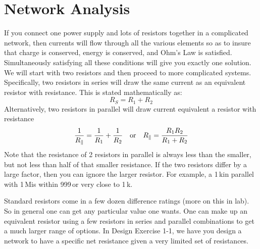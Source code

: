 \documentclass{article}
\begin{document}
\section{Network Analysis}
If you connect one power supply and lots of resistors together in a complicated network, then currents will flow through all the various elements so as to insure that charge is conserved, energy is conserved, and Ohm's Law is satisfied. Simultaneously satisfying all these conditions will give you exactly one solution. We will start with two resistors and then proceed to more complicated systems. Specifically, two resistors in series will draw the same current as an equivalent resistor with resistance. This is stated mathematically as:
\begin{equation}
R_S = R_1 + R_2
\end{equation}
Alternatively, two resistors in parallel will draw current equivalent a resistor with resistance
\begin{equation}
\frac{1}{R_\parallel} = \frac{1}{R_1} + \frac{1}{R_2} \quad \hbox{or} \quad R_\parallel = \frac{R_1 R_2}{R_1 + R_2}
\end{equation}
Note that the resistance of 2 resistors in parallel is always less than the smaller, but not less than half of that smaller resistance. If the two resistors differ by a large factor, then you can ignore the larger resistor. For example, a 1\,k\Ohm in parallel with 1\,M\Ohm is within 999\,\Ohm or very close to 1\,k\Ohm.

Standard resistors come in a few dozen difference ratings (more on this in lab). So in general one can get any particular value one wants. One can make up an equivalent resistor using a few resistors in series and parallel combinations to get a much larger range of options. In Design Exercise 1-1, we have you design a network to have a specific net resistance given a very limited set of resistances.
\end{document}
